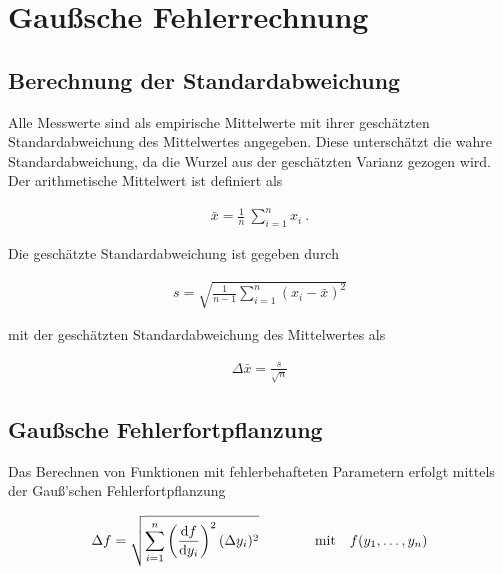 \newpage

\section{Gaußsche Fehlerrechnung}\label{gausssche-fehlerrechnung}

\subsection{Berechnung der
Standardabweichung}\label{berechnung-der-standardabweichung}

Alle Messwerte sind als empirische Mittelwerte mit ihrer geschätzten
Standardabweichung des Mittelwertes angegeben. Diese unterschätzt die
wahre Standardabweichung, da die Wurzel aus der geschätzten Varianz
gezogen wird. Der arithmetische Mittelwert ist definiert als

\begin{align}
    \bar x = \frac{1}{n} \  \sum_{i=1}^n x_i \  .
    \label{equ:mean}
\end{align}

Die geschätzte Standardabweichung ist gegeben durch

\begin{align}
    s = \sqrt{\frac{1}{n-1} \sum_{i=1}^n (x_i - \bar x)^2}
    \label{equ:s}
\end{align}

mit der geschätzten Standardabweichung des Mittelwertes als

\begin{align}
    \Delta \bar x = \frac{s}{ \sqrt{n} }
    \label{equ:stdofmean}
\end{align}

\subsection{Gaußsche
Fehlerfortpflanzung}\label{gausssche-fehlerfortpflanzung}

Das Berechnen von Funktionen mit fehlerbehafteten Parametern erfolgt
mittels der Gauß'schen Fehlerfortpflanzung

\begin{align}
    \Delta f = \sqrt{ \sum_{i=1}^n \left( \frac{\mathop{}\!\mathrm{d} f}{\mathop{}\!\mathrm{d} y_i} \right)^2 (\Delta y_i)^2} \qquad \qquad \mathrm{mit} \quad f(y_1, \ldots , y_n)
    \label{equ:gauss}
\end{align}
